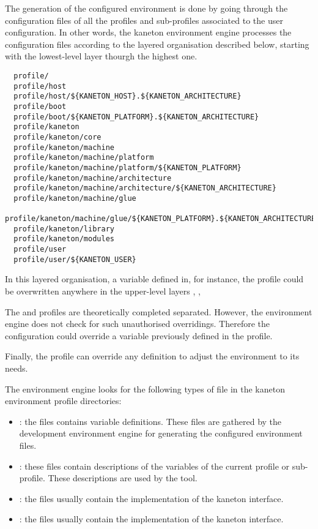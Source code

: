 The generation of the configured environment is done by going through
the configuration files of all the profiles and sub-profiles associated
to the user configuration. In other words, the kaneton environment engine
processes the configuration files according to the layered organisation
described below, starting with the lowest-level layer thourgh the highest one.

\begin{verbatim}
  profile/
  profile/host
  profile/host/${KANETON_HOST}.${KANETON_ARCHITECTURE}
  profile/boot
  profile/boot/${KANETON_PLATFORM}.${KANETON_ARCHITECTURE}
  profile/kaneton
  profile/kaneton/core
  profile/kaneton/machine
  profile/kaneton/machine/platform
  profile/kaneton/machine/platform/${KANETON_PLATFORM}
  profile/kaneton/machine/architecture
  profile/kaneton/machine/architecture/${KANETON_ARCHITECTURE}
  profile/kaneton/machine/glue
  profile/kaneton/machine/glue/${KANETON_PLATFORM}.${KANETON_ARCHITECTURE}
  profile/kaneton/library
  profile/kaneton/modules
  profile/user
  profile/user/${KANETON_USER}         
\end{verbatim}

In this layered organisation, a variable defined in, for instance, the
 profile could be overwritten anywhere in the upper-level layers
,
, 
\etc{}

The  and  profiles are theoretically completed
separated. However, the environment engine does not check for such
unauthorised overridings. Therefore the  configuration could
override a variable previously defined in the  profile.

Finally, the  profile can override any definition to adjust the
environment to its needs.

The environment engine looks for the following types of file in the
kaneton environment profile directories:

\begin{itemize}
  \item
    : the  files contains variable
    definitions. These files are gathered by the development environment
    engine for generating the configured environment files.
  \item
    : these  files contain descriptions of
    the variables of the current profile or sub-profile. These descriptions
    are used by the  tool.
  \item
    : the  files usually contain the implementation
    of the kaneton  interface.
  \item
    : the  files usually contain the
    implementation of the kaneton  interface.
\end{itemize}

